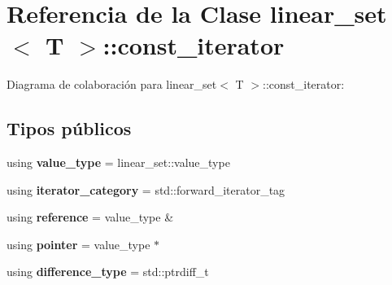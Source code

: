 \hypertarget{classlinear__set_1_1const__iterator}{\section{Referencia de la Clase linear\+\_\+set$<$ T $>$\+:\+:const\+\_\+iterator}
\label{classlinear__set_1_1const__iterator}
}


Diagrama de colaboración para linear\+\_\+set$<$ T $>$\+:\+:const\+\_\+iterator\+:
\subsection*{Tipos públicos}
\begin{DoxyCompactItemize}
\item 
\hypertarget{classlinear__set_1_1const__iterator_aeeb487937ec4d79cb6a1a08e73ac1f99}{using {\bfseries value\+\_\+type} = linear\+\_\+set\+::value\+\_\+type}\label{classlinear__set_1_1const__iterator_aeeb487937ec4d79cb6a1a08e73ac1f99}

\item 
\hypertarget{classlinear__set_1_1const__iterator_aa1f033d1d6817bba87a8a56db432f2e0}{using {\bfseries iterator\+\_\+category} = std\+::forward\+\_\+iterator\+\_\+tag}\label{classlinear__set_1_1const__iterator_aa1f033d1d6817bba87a8a56db432f2e0}

\item 
\hypertarget{classlinear__set_1_1const__iterator_a081f0692047d474e34e1ce924d3485ee}{using {\bfseries reference} = value\+\_\+type \&}\label{classlinear__set_1_1const__iterator_a081f0692047d474e34e1ce924d3485ee}

\item 
\hypertarget{classlinear__set_1_1const__iterator_acdc3e59c21faf9becf4c4dcf4ca1bef2}{using {\bfseries pointer} = value\+\_\+type $\ast$}\label{classlinear__set_1_1const__iterator_acdc3e59c21faf9becf4c4dcf4ca1bef2}

\item 
\hypertarget{classlinear__set_1_1const__iterator_ab68189d3b549fd08aea83d540cb7a1b0}{using {\bfseries difference\+\_\+type} = std\+::ptrdiff\+\_\+t}\label{classlinear__set_1_1const__iterator_ab68189d3b549fd08aea83d540cb7a1b0}

\end{DoxyCompactItemize}
